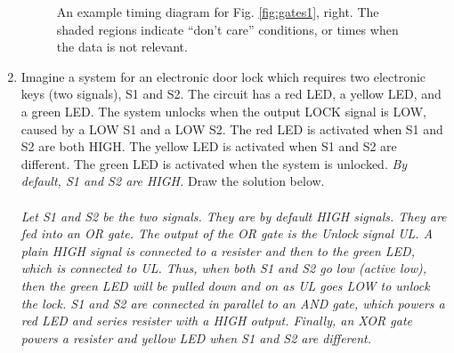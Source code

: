 \documentclass[10pt]{article}
\begin{document}
\begin{enumerate}
\begin{figure}[ht]
\caption{\label{fig:timing2} An example timing diagram for Fig. \ref{fig:gates1}, right.  The shaded regions indicate ``don't care'' conditions, or times when the data is not relevant.}
\end{figure}
\item Imagine a system for an electronic door lock which requires two electronic keys (two signals), S1 and S2.  The circuit has a red LED, a yellow LED, and a green LED.  The system unlocks when the output LOCK signal is LOW, caused by a LOW S1 and a LOW S2.  The red LED is activated when S1 and S2 are both HIGH.  The yellow LED is activated when S1 and S2 are different.  The green LED is activated when the system is unlocked.  \textit{By default, S1 and S2 are HIGH.} Draw the solution below.  \\ \\
\textit{Let S1 and S2 be the two signals.  They are by default HIGH signals.  They are fed into an OR gate.  The output of the OR gate is the Unlock signal UL.  A plain HIGH signal is connected to a resister and then to the green LED, which is connected to UL.  Thus, when both S1 and S2 go low (active low), then the green LED will be pulled down and on as UL goes LOW to unlock the lock.  S1 and S2 are connected in parallel to an AND gate, which powers a red LED and series resister with a HIGH output.  Finally, an XOR gate powers a resister and yellow LED when S1 and S2 are different.}
\end{enumerate}
\end{document}
